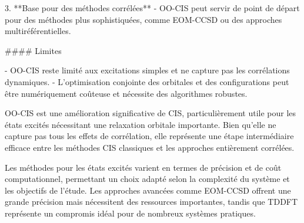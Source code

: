 \documentclass[12pt,a4paper]{report}
\begin{document}
\begin{markdown}
3. **Base pour des méthodes corrélées**
   - OO-CIS peut servir de point de départ pour des méthodes plus sophistiquées, comme EOM-CCSD ou des approches multiréférentielles.

#### Limites

- OO-CIS reste limité aux excitations simples et ne capture pas les corrélations dynamiques.
- L'optimisation conjointe des orbitales et des configurations peut être numériquement coûteuse et nécessite des algorithmes robustes.

OO-CIS est une amélioration significative de CIS, particulièrement utile pour les états excités nécessitant une relaxation orbitale importante. Bien qu'elle ne capture pas tous les effets de corrélation, elle représente une étape intermédiaire efficace entre les méthodes CIS classiques et les approches entièrement corrélées. 




Les méthodes pour les états excités varient en termes de précision et de coût computationnel, permettant un choix adapté selon la complexité du système et les objectifs de l'étude. Les approches avancées comme EOM-CCSD offrent une grande précision mais nécessitent des ressources importantes, tandis que TDDFT représente un compromis idéal pour de nombreux systèmes pratiques.

\end{markdown}
\end{document}
